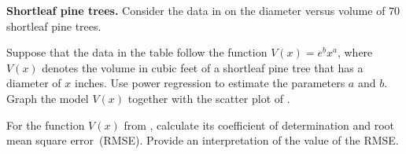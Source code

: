 \documentclass[a4paper,oneside,12pt]{article}
\begin{document}
\begin{example}
\label{eg:logarithm:shortleaf_pine_trees}
\textbf{Shortleaf pine trees.}
Consider the data in  on the diameter
versus volume of $70$ shortleaf pine trees.
\begin{packedenum}
\item\label{subeg:logarithm:shortleaf_power_regression}
  Suppose that the data in the table follow the function
  $V(x) = e^b x^a$, where $V(x)$ denotes the volume in cubic feet of a
  shortleaf pine tree that has a diameter of $x$ inches.  Use power
  regression to estimate the parameters $a$ and $b$.  Graph the model
  $V(x)$ together with the scatter plot of
  .

\item\label{subeg:logarithm:shortleaf_Pearson_r_RMS_error}
  For the function $V(x)$
  from , calculate
  its coefficient of determination and root mean square error~(RMSE).
  Provide an interpretation of the value of the RMSE.
\end{packedenum}
\end{example}
\end{document}
